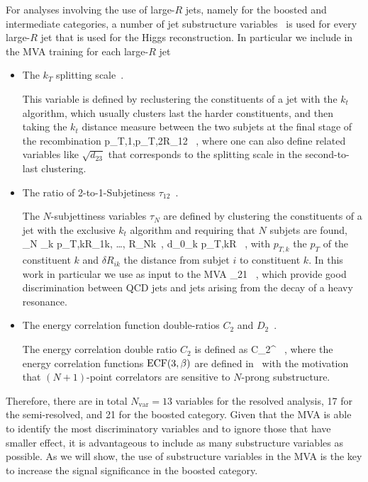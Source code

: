 For analyses involving the use of large-$R$ jets,
namely for the boosted and intermediate categories,
a number of jet substructure variables~\cite{Aad:2013gja} is used
for every large-$R$ jet that is used for the Higgs reconstruction.
%
In particular we include in the MVA training for each large-$R$ jet
\begin{itemize}
\item The $k_T$ splitting scale~\cite{Butterworth:2002tt,Butterworth:2008iy}.

  This variable is defined by reclustering the constituents of a jet with the
  $k_t$ algorithm, which usually clusters last the harder constituents, and then
  taking the $k_t$ distance measure between the two subjets at the final stage of the recombination
  \be
  \label{eq:ktsplitting}
 \lp p_{T,1},p_{T,2}\rp \cdot \Delta R_{12} \, ,
\ee
where one can also define related variables like $\sqrt{d_{23}}$ that corresponds to the
splitting scale in the second-to-last clustering.
  
\item The ratio of 2-to-1-Subjetiness $\tau_{12}$~\cite{Thaler:2010tr,Thaler:2011gf}.

  The $N$-subjettiness variables $\tau_N$ are defined by clustering the constituents
  of a jet with the exclusive $k_t$ algorithm and requiring that $N$ subjets are found,
  \be
  \tau_N \equiv {} \sum_k p_{T,k}\lp \delta R_{1k}, \ldots,
  \delta R_{Nk}\rp \, , \qquad d_0\equiv \sum_k p_{T,k}\cdot R \, ,
  \ee
  with $ p_{T,k}$ the $p_T$ of the constituent $k$ and $\delta R_{ik}$ the distance from
  subjet $i$ to constituent $k$.
  In this work in particular we use as input to the MVA
  \be
  \label{eq:tau21}
\tau_{21} \equiv {} \, ,
  \ee
  which provide good discrimination between QCD jets and jets arising from the decay of
  a heavy resonance.
  
\item The energy correlation function double-ratios $C_2$ and $D_2$~\cite{Larkoski:2013eya}.

  The energy correlation double ratio $C_2$ is defined
  as
  \be
  \label{eq:c2}
C_2^{\beta} \equiv {} \, ,
  \ee
  where the energy correlation functions ${\rm ECF}(3,\beta)$ are defined
  in~\cite{Larkoski:2013eya} with the motivation that $(N+1)$-point correlators
  are sensitive to $N$-prong substructure.

\end{itemize}
%
Therefore, there are in total $N_{\mathrm{var}}=13$ variables for the resolved analysis,
17 for the semi-resolved, and 21 for the boosted category.
%
Given that the MVA is able to identify the most discriminatory variables
and to ignore those that have smaller effect, it is advantageous to
include as many substructure variables as possible.
%
As we will show, the use of substructure variables in the MVA is the key to increase the signal
significance in the boosted category.

